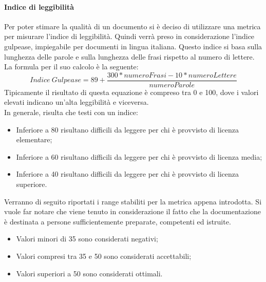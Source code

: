 \documentclass[../PianoDiQualifica.tex]{subfiles}
\begin{document}
			\paragraph{Indice di leggibilità}
			Per poter stimare la qualità di un documento si è deciso di utilizzare una metrica per misurare l'indice di leggibilità. Quindi verrà preso in considerazione l'indice gulpease, impiegabile per documenti in lingua italiana. Questo indice si basa sulla lunghezza delle parole e sulla lunghezza delle frasi rispetto al numero di lettere.\\La formula per il suo calcolo è la seguente:
			\begin{equation*}
				Indice \ Gulpease = 89 + \frac{300*numeroFrasi - 10*numeroLettere}{numeroParole}
			\end{equation*}
			Tipicamente il risultato di questa equazione è compreso tra 0 e 100, dove i valori elevati indicano un'alta leggibilità e viceversa.\\
			In generale, risulta che testi con un indice:
			\begin{itemize}
				\item Inferiore a 80 risultano difficili da leggere per chi è provvisto di licenza elementare;
				\item Inferiore a 60 risultano difficili da leggere per chi è provvisto di licenza media;
				\item Inferiore a 40 risultano difficili da leggere per chi è provvisto di licenza superiore.
			\end{itemize}
			Verranno di seguito riportati i range stabiliti per la metrica appena introdotta. Si vuole far notare che viene tenuto in considerazione il fatto che la documentazione è destinata a persone sufficientemente preparate, competenti ed istruite.
			\begin{itemize}
				\item Valori minori di 35 sono considerati negativi;
				\item Valori compresi tra 35 e 50 sono considerati accettabili;
				\item Valori superiori a 50 sono considerati ottimali.
			\end{itemize}
\end{document}

